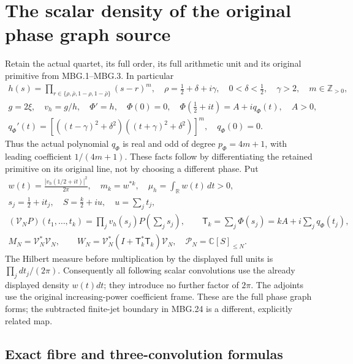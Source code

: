 \section{The scalar density of the original phase graph source}
\label{GraphV2:sec:pgd-density}

Retain the actual quartet, its full order, its full arithmetic unit and its
original primitive from MBG.1--MBG.3. In particular
\[
 \begin{gathered}
 h(s)=\prod_{r\in\{\rho,\bar\rho,1-\rho,1-\bar\rho\}}(s-r)^m,
 \quad \rho=\tfrac12+\delta+i\gamma,\quad
 0<\delta<\tfrac12,\quad \gamma>2,\quad m\in\mathbb Z_{>0},\\
 g=2\xi,\quad v_h=g/h,\quad \Phi'=h,\quad\Phi(0)=0,\quad
 \Phi(\tfrac12+it)=A+iq_\Phi(t),\quad A>0,\\
 q_\Phi'(t)=
 \left[((t-\gamma)^2+\delta^2)((t+\gamma)^2+\delta^2)\right]^m,
 \quad q_\Phi(0)=0.
 \end{gathered}
 \tag{PGD.1}\label{GraphV2:eq:pgd-data}
\]
Thus the actual polynomial \(q_\Phi\) is real and odd of degree
\(p_\Phi=4m+1\), with leading coefficient \(1/(4m+1)\).
These facts follow by differentiating the retained primitive on its
original line, not by choosing a different phase. Put
\[
 \begin{gathered}
 w(t)=\frac{|v_h(1/2+it)|^2}{2\pi},\quad
 m_k=w^{*k},\quad \mu_h=\int_{\mathbb{R}}w(t)\,dt>0,\\
 s_j=\tfrac12+it_j,\quad S=\tfrac k2+iu,\quad u=\sum_jt_j,\\
 (\mathcal V_NP)(t_1,\ldots,t_k)
       =\prod_jv_h(s_j)P\left(\sum_js_j\right),\qquad
 \mathsf T_k=\sum_j\Phi(s_j)=kA+i\sum_jq_\Phi(t_j),\\
 M_N=\mathcal V_N^*\mathcal V_N,\qquad
 W_N=\mathcal V_N^*(I+\mathsf T_k^*\mathsf T_k)\mathcal V_N,
 \quad \mathcal P_N=\mathbb{C}[S]_{\leq N}.
 \end{gathered}
 \tag{PGD.2}\label{GraphV2:eq:pgd-source}
\]
The Hilbert measure before multiplication by the displayed full units is
\(\prod_jdt_j/(2\pi)\). Consequently all following scalar convolutions
use the already displayed density \(w(t)dt\); they introduce no further
factor of \(2\pi\). The adjoints use the original increasing-power
coefficient frame. These are the full phase graph forms; the subtracted
finite-jet boundary in MBG.24 is a different, explicitly related map.

\subsection{Exact fibre and three-convolution formulas}

